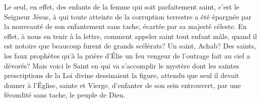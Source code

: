 Le seul, en effet, des enfants de la femme qui soit parfaitement saint,
	c'est le Seigneur Jésus,
	à qui toute atteinte de la corruption terrestre a été épargnée
		par la nouveauté de son enfantement sans tache,
	écartée par sa majesté céleste.
En effet, à nous en tenir à la lettre,
	comment appeler saint tout enfant mâle,
	quand il est notoire que beaucoup furent de grands scélérats?
Un saint, Achab?
Des saints, les faux prophètes
		qu'à la prière d'Élie un feu vengeur de l'outrage fait au ciel a dévorés?
Mais voici le Saint en qui va s'accomplir le mystère
		dont les saintes prescriptions de la Loi divine dessinaient la figure,
	attendu que seul il devait donner à l'Église, sainte et Vierge,
	d'enfanter de son sein entrouvert, par une fécondité sans tache, le peuple de Dieu.
